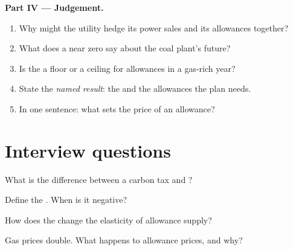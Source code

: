 \begin{problem}
\medskip\noindent\textbf{Part IV --- Judgement.}
\begin{enumerate}[resume]
\item Why might the utility hedge its power sales and its allowances together?
\item What does a  near zero say about the coal plant's future?
\item Is the  a floor or a ceiling for allowances in a gas-rich year?
\item State the \emph{named result}: the  and the allowances the plan needs.
\item In one sentence: what sets the price of an allowance?
\end{enumerate}
\end{problem}

\section{Interview questions}

\begin{interviewq}\label{iq:m3:emissions-and-environmental-markets:1}
What is the difference between a carbon tax and ?
\end{interviewq}

\begin{interviewq}\label{iq:m3:emissions-and-environmental-markets:2}
Define the . When is it negative?
\end{interviewq}

\begin{interviewq}\label{iq:m3:emissions-and-environmental-markets:3}
How does the  change the elasticity of allowance supply?
\end{interviewq}

\begin{interviewq}\label{iq:m3:emissions-and-environmental-markets:4}
Gas prices double. What happens to allowance prices, and why?
\end{interviewq}

